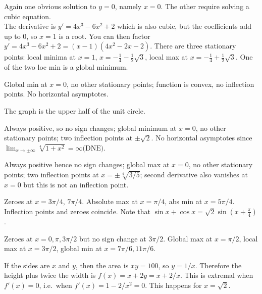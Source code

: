 \item[{\bfseries(V12.32)}]
Again one obvious solution to $y=0$, namely $x=0$.  The other
require solving a cubic equation.\\ The derivative is
$y'=4x^3-6x^2+2$ which is also cubic, but the coefficients add up to
0, so $x=1$ is a root.  You can then factor
$y'=4x^3-6x^2+2=(x-1)(4x^2-2x-2)$.  There are three stationary
points: local minima at $x=1$, $x=-\frac14 - \frac12\surd3$, local
max at $x=-\frac14 + \frac12\surd3$.  One of the two loc min is a
global minimum.
\bigskip

\item[{\bfseries(V12.33)}]
Global min at $x=0$, no other stationary points;  function is
convex, no inflection points.  No horizontal asymptotes.
\bigskip

\item[{\bfseries(V12.34)}]
The graph is the upper half of the unit circle.
\bigskip

\item[{\bfseries(V12.35)}]
Always positive, so no sign changes;  global minimum at $x=0$, no
other stationary points; two inflection points at $\pm\surd2$.  No
horizontal asymptotes since $\lim_{x\to\pm\infty} \sqrt[4]{1+x^2} =
\infty \textrm{(DNE)}$.
\bigskip

\item[{\bfseries(V12.36)}]
Always positive hence no sign changes; global max at $x=0$, no other
stationary points;  two inflection points at $x=\pm\sqrt[4]{3/5}$;
second derivative also vanishes at $x=0$ but this is not an
inflection point.
\bigskip

\item[{\bfseries(V12.38)}]
Zeroes at $x=3\pi/4$, $7\pi/4$. Absolute max at $x=\pi/4$, abs min at
$x=5\pi/4$.  Inflection points and zeroes coincide.  Note that
$\sin x+\cos x = \sqrt2 \sin(x+\frac\pi4)$.
\bigskip

\item[{\bfseries(V12.39)}]
Zeroes at $x=0, \pi, 3\pi/2$ but no sign change at $3\pi/2$.  Global
max at $x=\pi/2$, local max at $x=3\pi/2$, global min at $x=7\pi/6,
11\pi/6$.
\bigskip

\item[{\bfseries(V14.1)}]
If the sides are $x$ and $y$, then the area is $xy = 100$, so $y=1/x$.
Therefore the height plus twice the width is $f(x) = x+2y = x+2/x$.
This is extremal when $f'(x) = 0$, i.e.\ when $f'(x) = 1-2/x^2 = 0$.
This happens for $x=\sqrt2$.
\bigskip

